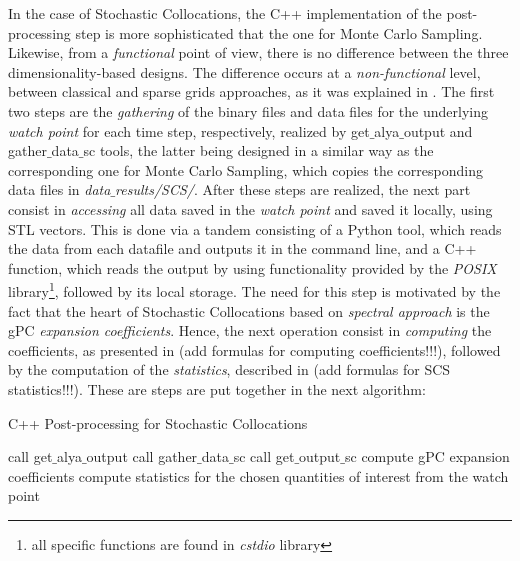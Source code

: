 	In the case of Stochastic Collocations, the C++ implementation of the post-processing step is more sophisticated that the one for Monte Carlo Sampling. Likewise, from a \emph{functional} point of view, there is no difference between the three dimensionality-based designs. The difference occurs at a \emph{non-functional} level, between classical and sparse grids approaches, as it was explained in . The first two steps are the \emph{gathering} of the binary files and data files for the underlying \emph{watch point} for each time step, respectively, realized by get$\_$alya$\_$output and gather$\_$data$\_$sc tools, the latter being designed in a similar way as the corresponding one for Monte Carlo Sampling, which copies the corresponding data files in \emph{data$\_$results/SCS/}. After these steps are realized, the next part consist in \emph{accessing} all data saved in the \emph{watch point} and saved it locally, using STL vectors. This is done via a tandem consisting of a Python tool, which reads the data from each datafile and outputs it in the command line, and a C++ function, which reads the output by using functionality provided by the \emph{POSIX} library\footnote{all specific functions are found in \emph{cstdio} library}, followed by its local storage. The need for this step is motivated by the fact that the heart of Stochastic Collocations based on \emph{spectral approach} is the gPC \emph{expansion coefficients}. Hence, the next operation consist in \emph{computing} the coefficients, as presented in (add formulas for computing coefficients!!!), followed by the computation of the \emph{statistics}, described in (add formulas for SCS statistics!!!). These are steps are put together in the next algorithm:
\begin{algorithm}
\caption{C++ Post-processing for Stochastic Collocations
\label{alg:SCS_preproc}}
  \begin{algorithmic}[1]
        \State call get$\_$alya$\_$output 
        \State call gather$\_$data$\_$sc 
        \State call get$\_$output$\_$sc 
        \State compute gPC expansion coefficients
        \State compute statistics for the chosen quantities of interest from the watch point
    \EndFor
  \end{algorithmic}
\end{algorithm}

